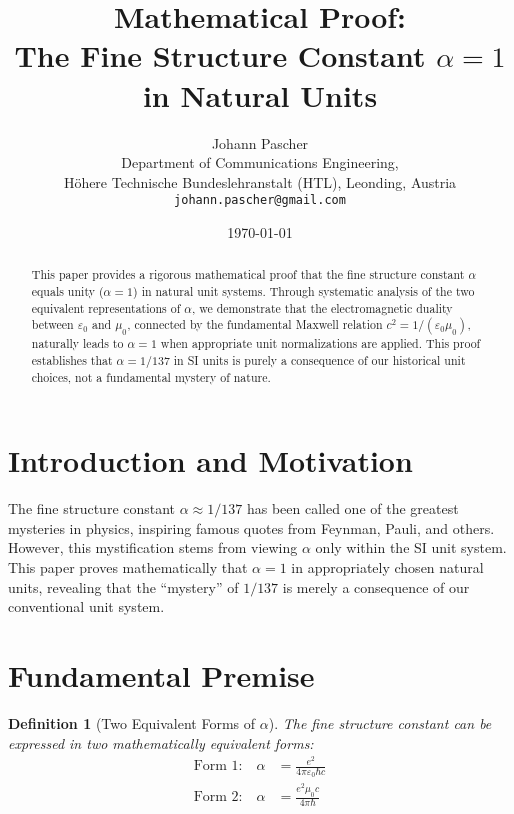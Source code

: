 \documentclass[12pt,a4paper]{article}
\newcommand{\alphaem}{\alpha}
\newtheorem{definition}[theorem]{Definition}
\begin{document}
	
	\title{Mathematical Proof: \\
		The Fine Structure Constant $\alpha = 1$ \\
		in Natural Units}
	\author{Johann Pascher\\
		Department of Communications Engineering,\\
		H{\"o}here Technische Bundeslehranstalt (HTL), Leonding, Austria\\
		\texttt{johann.pascher@gmail.com}}
	\date{\today}
	
	\maketitle
	
	\begin{abstract}
		This paper provides a rigorous mathematical proof that the fine structure constant $\alpha$ equals unity ($\alpha = 1$) in natural unit systems. Through systematic analysis of the two equivalent representations of $\alpha$, we demonstrate that the electromagnetic duality between $\varepsilon_0$ and $\mu_0$, connected by the fundamental Maxwell relation $c^2 = 1/(\varepsilon_0\mu_0)$, naturally leads to $\alpha = 1$ when appropriate unit normalizations are applied. This proof establishes that $\alpha = 1/137$ in SI units is purely a consequence of our historical unit choices, not a fundamental mystery of nature.
	\end{abstract}
	
	\tableofcontents
	\newpage
	
	\section{Introduction and Motivation}
	
	The fine structure constant $\alpha \approx 1/137$ has been called one of the greatest mysteries in physics, inspiring famous quotes from Feynman, Pauli, and others. However, this mystification stems from viewing $\alpha$ only within the SI unit system. This paper proves mathematically that $\alpha = 1$ in appropriately chosen natural units, revealing that the ``mystery'' of $1/137$ is merely a consequence of our conventional unit system.
	
	\section{Fundamental Premise}
	
	\begin{definition}[Two Equivalent Forms of $\alpha$]
		The fine structure constant can be expressed in two mathematically equivalent forms:
		\begin{align}
			\text{Form 1:} \quad \alphaem &= \frac{e^2}{4\pi\varepsilon_0\hbar c} \label{eq:alpha_form1}\\
			\text{Form 2:} \quad \alphaem &= \frac{e^2 \mu_0 c}{4\pi \hbar} \label{eq:alpha_form2}
		\end{align}
	\end{definition}
	
\end{document}
